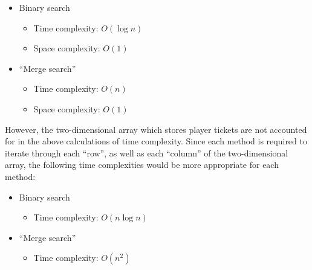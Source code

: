\begin{itemize}
\item Binary search
	\begin{itemize}
	\item Time complexity: $O(\log n)$
	\item Space complexity: $O(1)$
	\end{itemize}
\item ``Merge search''
	\begin{itemize}
	\item Time complexity: $O(n)$
	\item Space complexity: $O(1)$
	\end{itemize}
\end{itemize}

\noindent
However, the two-dimensional array which stores player tickets are not accounted for in the above calculations of time complexity. Since each method is required to iterate through each ``row'', as well as each ``column'' of the two-dimensional array, the following time complexities would be more appropriate for each method:

\begin{itemize}
\item Binary search
	\begin{itemize}
	\item Time complexity: $O(n \log n)$
	\end{itemize}
\item ``Merge search''
	\begin{itemize}
	\item Time complexity: $O(n^2)$
	\end{itemize}
\end{itemize}